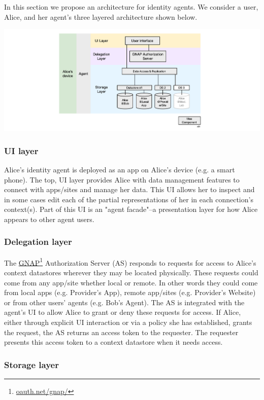 \documentclass[11pt, oneside]{article}   	%
\newcommand{\hyperfootnote}[1][]{\def\ArgI{{#1}}\hyperfootnoteRelay}
\newcommand\hyperfootnoteRelay[2][]{\href{#1#2}{\ArgI}\footnote{\href{#1#2}{#2}}}
\begin{document}
In this section we propose an architecture for identity agents. We consider a user, Alice, and her agent's three layered architecture shown below.

\includegraphics[width=\textwidth]{./images/architecture.png}

\subsubsection{UI layer}

Alice's identity agent is deployed as an app on Alice's device (e.g. a smart phone). The top, UI layer provides Alice with data management features to connect with apps/sites and manage her data. This UI allows her to inspect and in some cases edit each of the partial representations of her in each connection's context(s). Part of this UI is an "agent facade"--a presentation layer for how Alice appears to other agent users. 

\subsubsection{Delegation layer}

The \hyperfootnote[GNAP][https://]{oauth.net/gnap/} Authorization Server (AS) responds to requests for access to Alice's context datastores wherever they may be located physically. These requests could come from any app/site whether local or remote. In other words they could come from local apps (e.g. Provider's App), remote app/sites (e.g. Provider's Website) or from other users' agents (e.g. Bob's Agent). The AS is integrated with the agent's UI to allow Alice to grant or deny these requests for access. If Alice, either through explicit UI interaction or via a policy she has established, grants the request, the AS returns an access token to the requester. The requester presents this access token to a context datastore when it needs access. 

\subsubsection{Storage layer}
\end{document}
